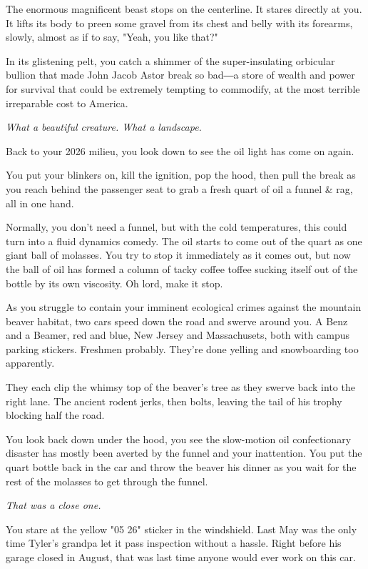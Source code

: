 \documentclass[a5paper, symmetric]{tufte-book}
\begin{document}
The enormous magnificent beast stops on the centerline. It stares directly at you. It lifts its body to preen some gravel from its chest and belly with its forearms, slowly, almost as if to say, "Yeah, you like that?"

In its glistening pelt, you catch a shimmer of the super-insulating orbicular bullion that made John Jacob Astor break so bad―a store of wealth and power for survival that could be extremely tempting to commodify, at the most terrible irreparable cost to America. 

\textit{What a beautiful creature. What a landscape.}

Back to your 2026 milieu, you look down to see the oil light has come on again. 

You put your blinkers on, kill the ignition, pop the hood, then pull the break as you reach behind the passenger seat to grab a fresh quart of oil a funnel \& rag, all in one hand.  

Normally, you don't need a funnel, but with the cold temperatures, this could turn into a fluid dynamics comedy. The oil starts to come out of the quart as one giant ball of molasses. You try to stop it immediately as it comes out, but now the ball of oil has formed a column of tacky coffee toffee sucking itself out of the bottle by its own viscosity. Oh lord, make it stop. 

As you struggle to contain your imminent ecological crimes against the mountain beaver habitat, two cars speed down the road and swerve around you. A Benz and a Beamer, red and blue, New Jersey and Massachusets, both with campus parking stickers. Freshmen probably. They're done yelling and snowboarding too apparently.

They each clip the whimsy top of the beaver's tree as they swerve back into the right lane. The ancient rodent jerks, then bolts, leaving the tail of his trophy blocking half the road. 

You look back down under the hood, you see the slow-motion oil confectionary disaster has mostly been averted by the funnel and your inattention. You put the quart bottle back in the car and throw the beaver his dinner as you wait for the rest of the molasses to get through the funnel. 

\textit{That was a close one.}

You stare at the yellow "05 26" sticker in the windshield. Last May was the only time Tyler's grandpa let it pass inspection without a hassle. Right before his garage closed in August, that was last time anyone would ever work on this car. 
\end{document}
